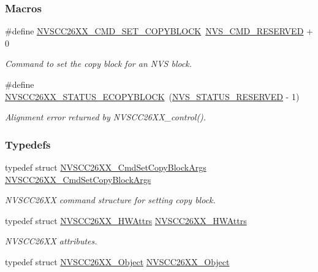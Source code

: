 \subsubsection*{Macros}
\begin{DoxyCompactItemize}
\item 
\#define \hyperlink{_n_v_s_c_c26_x_x_8h_a6298f92f68199f11a797668f42342a7f}{N\+V\+S\+C\+C26\+X\+X\+\_\+\+C\+M\+D\+\_\+\+S\+E\+T\+\_\+\+C\+O\+P\+Y\+B\+L\+O\+C\+K}~\hyperlink{group___n_v_s___c_o_n_t_r_o_l_gaa9fa1c41660d17139bce63ff34cd774f}{N\+V\+S\+\_\+\+C\+M\+D\+\_\+\+R\+E\+S\+E\+R\+V\+E\+D} + 0
\begin{DoxyCompactList}\small\item\em Command to set the copy block for an N\+V\+S block. \end{DoxyCompactList}\item 
\#define \hyperlink{_n_v_s_c_c26_x_x_8h_a302d15a2cec08287600a53522a62228e}{N\+V\+S\+C\+C26\+X\+X\+\_\+\+S\+T\+A\+T\+U\+S\+\_\+\+E\+C\+O\+P\+Y\+B\+L\+O\+C\+K}~(\hyperlink{group___n_v_s___c_o_n_t_r_o_l_gad82fd139152ca14946c80c6c91edb4a0}{N\+V\+S\+\_\+\+S\+T\+A\+T\+U\+S\+\_\+\+R\+E\+S\+E\+R\+V\+E\+D} -\/ 1)
\begin{DoxyCompactList}\small\item\em Alignment error returned by N\+V\+S\+C\+C26\+X\+X\+\_\+control(). \end{DoxyCompactList}\end{DoxyCompactItemize}
\subsubsection*{Typedefs}
\begin{DoxyCompactItemize}
\item 
typedef struct \hyperlink{struct_n_v_s_c_c26_x_x___cmd_set_copy_block_args}{N\+V\+S\+C\+C26\+X\+X\+\_\+\+Cmd\+Set\+Copy\+Block\+Args} \hyperlink{_n_v_s_c_c26_x_x_8h_a73748a39601f1b276b5bdbe222e1e5f2}{N\+V\+S\+C\+C26\+X\+X\+\_\+\+Cmd\+Set\+Copy\+Block\+Args}
\begin{DoxyCompactList}\small\item\em N\+V\+S\+C\+C26\+X\+X command structure for setting copy block. \end{DoxyCompactList}\item 
typedef struct \hyperlink{struct_n_v_s_c_c26_x_x___h_w_attrs}{N\+V\+S\+C\+C26\+X\+X\+\_\+\+H\+W\+Attrs} \hyperlink{_n_v_s_c_c26_x_x_8h_a38491f6eb4860eab3549daf9ad4c273a}{N\+V\+S\+C\+C26\+X\+X\+\_\+\+H\+W\+Attrs}
\begin{DoxyCompactList}\small\item\em N\+V\+S\+C\+C26\+X\+X attributes. \end{DoxyCompactList}\item 
typedef struct \hyperlink{struct_n_v_s_c_c26_x_x___object}{N\+V\+S\+C\+C26\+X\+X\+\_\+\+Object} \hyperlink{_n_v_s_c_c26_x_x_8h_a008a277378544c3ce2b65a2e9688d49e}{N\+V\+S\+C\+C26\+X\+X\+\_\+\+Object}
\end{DoxyCompactItemize}
